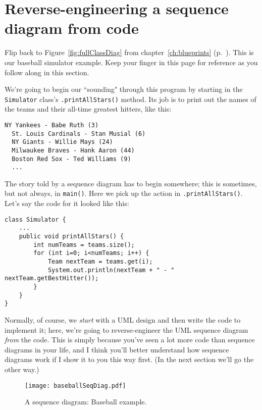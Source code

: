 \section{Reverse-engineering a sequence diagram from code}

Flip back to Figure~\ref{fig:fullClassDiag} from chapter~\ref{ch:blueprints}
(p.~\pageref{fig:fullClassDiag}). This is our baseball simulator example. Keep
your finger in this page for reference as you follow along in this section.

We're going to begin our ``sounding" through this program by starting in the
\texttt{Simulator} class's \texttt{.printAllStars()} method. Its job is to
print out the names of the teams and their all-time greatest hitters, like
this:

\begin{Verbatim}[fontsize=\normalsize,samepage=true,frame=single]
  NY Yankees - Babe Ruth (3)
  St. Louis Cardinals - Stan Musial (6)
  NY Giants - Willie Mays (24)
  Milwaukee Braves - Hank Aaron (44)
  Boston Red Sox - Ted Williams (9)
  ...
\end{Verbatim}

The story told by a sequence diagram has to begin somewhere; this is
sometimes, but not always, in \texttt{main()}. Here we pick up the action in
\texttt{.printAllStars()}. Let's say the code for it looked like this:

\begin{Verbatim}[fontsize=\small,samepage=true,frame=single]
class Simulator {
    ...
    public void printAllStars() {
        int numTeams = teams.size();
        for (int i=0; i<numTeams; i++) {
            Team nextTeam = teams.get(i);
            System.out.println(nextTeam + " - " nextTeam.getBestHitter());
        }
    }
}
\end{Verbatim}

Normally, of course, we \textit{start} with a UML design and then write the
code to implement it; here, we're going to reverse-engineer the UML sequence
diagram \textit{from} the code. This is simply because you've seen a lot more
code than sequence diagrams in your life, and I think you'll better understand
how sequence diagrams work if I show it to you this way first. (In the next
section we'll go the other way.)

\begin{figure}
\centering
\texttt{[image: baseballSeqDiag.pdf]} %
\vspace{.1in}
\caption{A sequence diagram: Baseball example.}
\label{fig:baseballSeqDiag}
\end{figure}

